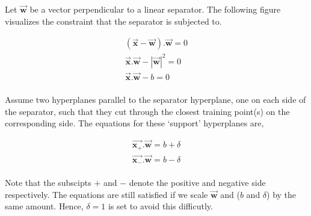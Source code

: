 \documentclass[11pt, a4paper]{article}
\begin{document}
Let $\vec{\mathbf{w}}$ be a vector perpendicular to a linear separator. The following figure visualizes the constraint that the separator is subjected to.

\FloatBarrier\clearpage
\begin{figure}[htbp]
	\centering
\end{figure}

\begin{align*}
	(\vec{\mathbf{x}} - \vec{\mathbf{w}}).\vec{\mathbf{w}} = 0   \\
	\vec{\mathbf{x}}.\vec{\mathbf{w}} - |\vec{\mathbf{w}}|^2 = 0 \\
	\vec{\mathbf{x}}.\vec{\mathbf{w}} - b = 0                    \\
\end{align*}

Assume two hyperplanes parallel to the separator hyperplane, one on each side of the separator, such that they cut through the closest training point(s) on the corresponding side. The equations for these `support' hyperplanes are,

\begin{align*}
	\vec{\mathbf{x_{+}}}.\vec{\mathbf{w}} = b + \delta \\
	\vec{\mathbf{x_{-}}}.\vec{\mathbf{w}} = b - \delta \\
\end{align*}

Note that the subscipts $+$ and $-$ denote the positive and negative side respectively. The equations are still satisfied if we scale $\vec{\mathbf{w}}$ and ($b$ and $\delta$) by the same amount. Hence, $\delta = 1$ is set to avoid this difficutly. 
\end{document}
